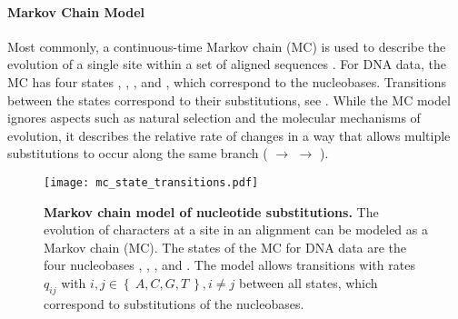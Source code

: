 \paragraph{Markov Chain Model}
\label{ch:Foundations:sec:MLTreeInference:sub:ModelsOfSeqEvol:par:MCModel}

Most commonly, a continuous-time Markov chain (MC) is used to describe
the evolution of a single site within a set of aligned sequences \cite{Gagniuc2017}.
For DNA data, the MC has four states , , , and ,
which correspond to the nucleobases.
Transitions between the states correspond to their substitutions, see .
While the MC model ignores aspects such as natural selection and the molecular mechanisms of evolution,
it describes the relative rate of changes in a way that allows multiple substitutions to occur
along the same branch ( $\rightarrow$  $\rightarrow$ ).

\begin{figure}[hpbt]
    \centering
    \texttt{[image: mc\_state\_transitions.pdf]}
    \caption[Markov chain model of nucleotide substitutions]{
        \textbf{Markov chain model of nucleotide substitutions.}
        The evolution of characters at a site in an alignment can be modeled as a Markov chain (MC).
        The states of the MC for DNA data are the four nucleobases
        , , , and .
        The model allows transitions with rates $q_{ij}$ with $i,j \in \left\{~ A, C, G, T ~\right\}, i \neq j$ between all states,
        which correspond to substitutions of the nucleobases.
    }
    \label{fig:mc_state_transitions}
\end{figure}

